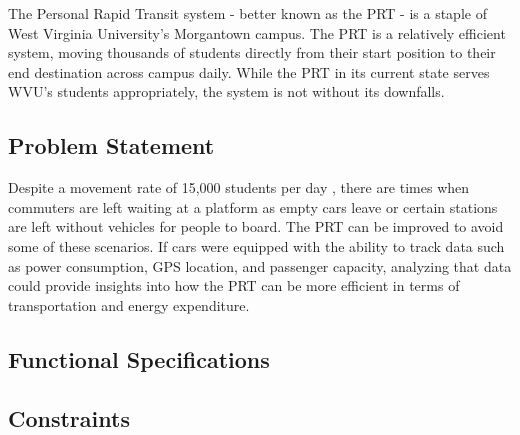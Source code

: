 The Personal Rapid Transit system - better known as the PRT - is a staple of West Virginia University’s Morgantown campus. The PRT is a relatively efficient system, moving thousands of students \cite{about-prt} directly from their start position to their end destination across campus daily. While the PRT in its current state serves WVU’s students appropriately, the system is not without its downfalls.

\subsection{Problem Statement}
Despite a movement rate of 15,000 students per day \cite{about-prt}, there are times when commuters are left waiting at a platform as empty cars leave or certain stations are left without vehicles for people to board. The PRT can be improved to avoid some of these scenarios. If cars were equipped with the ability to track data such as power consumption, GPS location, and passenger capacity, analyzing that data could provide insights into how the PRT can be more efficient in terms of transportation and energy expenditure.

\subsection{Functional Specifications}

\subsection{Constraints}